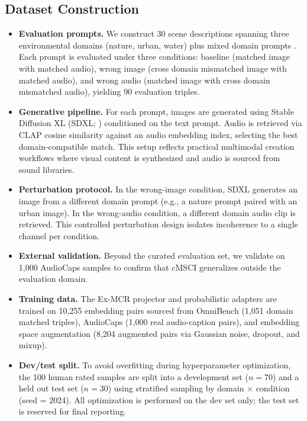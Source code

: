 \documentclass[a4paper,fleqn]{cas-sc}
\begin{document}
\subsection{Dataset Construction}
\begin{itemize}


\item \textbf{Evaluation prompts.} We construct 30 scene descriptions spanning three environmental domains (nature, urban, water) plus mixed domain prompts . Each prompt is evaluated under three conditions: baseline (matched image with matched audio), wrong image (cross domain mismatched image with matched audio), and wrong audio (matched image with cross domain mismatched audio), yielding 90 evaluation triples.



\item \textbf{Generative pipeline.} For each prompt, images are generated using Stable Diffusion XL (SDXL; \citet{Podell2024}) conditioned on the text prompt. Audio is retrieved via CLAP cosine similarity against an audio embedding index, selecting the best domain-compatible match. This setup reflects practical multimodal creation workflows where visual content is synthesized and audio is sourced from sound libraries.

\item \textbf{Perturbation protocol.} In the wrong-image condition, SDXL generates an image from a different domain prompt (e.g., a nature prompt paired with an urban image). In the wrong-audio condition, a different domain audio clip is retrieved. This controlled perturbation design isolates incoherence to a single channel per condition.

\item \textbf{External validation.} Beyond the curated evaluation set, we validate on 1{,}000 AudioCaps samples \citep{Kim2019} to confirm that cMSCI generalizes outside the evaluation domain.

\item \textbf{Training data.} The Ex-MCR projector and probabilistic adapters are trained on 10{,}255 embedding pairs sourced from OmniBench (1{,}051 domain matched triples), AudioCaps (1{,}000 real audio-caption pairs), and embedding space augmentation (8{,}204 augmented pairs via Gaussian noise, dropout, and mixup).

\item \textbf{Dev/test split.} To avoid overfitting during hyperparameter optimization, the 100 human rated samples are split into a development set ($n=70$) and a held out test set ($n=30$) using stratified sampling by domain $\times$ condition (seed = 2024). All optimization is performed on the dev set only; the test set is reserved for final reporting.




\end{itemize}
\end{document}

